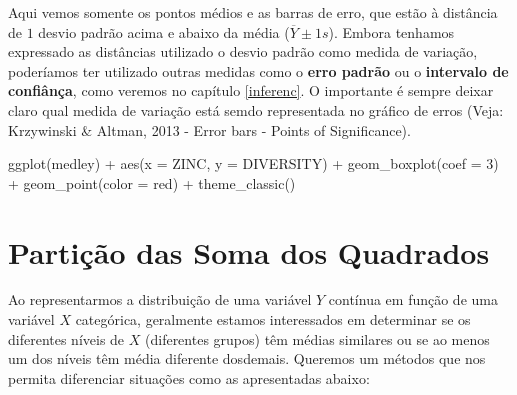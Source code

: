 \documentclass[
]{book}
\newenvironment{Shaded}{\begin{snugshade}}{\end{snugshade}}
\newcommand{\AttributeTok}[1]{\textcolor[rgb]{0.77,0.63,0.00}{#1}}
\newcommand{\DecValTok}[1]{\textcolor[rgb]{0.00,0.00,0.81}{#1}}
\newcommand{\FunctionTok}[1]{\textcolor[rgb]{0.00,0.00,0.00}{#1}}
\newcommand{\NormalTok}[1]{#1}
\newcommand{\SpecialCharTok}[1]{\textcolor[rgb]{0.00,0.00,0.00}{#1}}
\newcommand{\StringTok}[1]{\textcolor[rgb]{0.31,0.60,0.02}{#1}}
\begin{document}
Aqui vemos somente os pontos médios e as barras de erro, que estão à distância de \(1\) desvio padrão acima e abaixo da média (\(\overline{Y} \pm 1s\)). Embora tenhamos expressado as distâncias utilizado o desvio padrão como medida de variação, poderíamos ter utilizado outras medidas como o \textbf{erro padrão} ou o \textbf{intervalo de confiânça}, como veremos no capítulo \ref{inferenc}. O importante é sempre deixar claro qual medida de variação está semdo representada no gráfico de erros (Veja: Krzywinski \& Altman, 2013 - Error bars - Points of Significance).

\begin{Shaded}
\begin{Highlighting}[]
\FunctionTok{ggplot}\NormalTok{(medley) }\SpecialCharTok{+}
  \FunctionTok{aes}\NormalTok{(}\AttributeTok{x =}\NormalTok{ ZINC, }\AttributeTok{y =}\NormalTok{ DIVERSITY) }\SpecialCharTok{+}
  \FunctionTok{geom\_boxplot}\NormalTok{(}\AttributeTok{coef =} \DecValTok{3}\NormalTok{) }\SpecialCharTok{+}
  \FunctionTok{geom\_point}\NormalTok{(}\AttributeTok{color =} \StringTok{\textquotesingle{}red\textquotesingle{}}\NormalTok{) }\SpecialCharTok{+}
  \FunctionTok{theme\_classic}\NormalTok{()}
\end{Highlighting}
\end{Shaded}

\hypertarget{partiuxe7uxe3o-das-soma-dos-quadrados}{%
\section{Partição das Soma dos Quadrados}\label{partiuxe7uxe3o-das-soma-dos-quadrados}}

Ao representarmos a distribuição de uma variável \(Y\) contínua em função de uma variável \(X\) categórica, geralmente estamos interessados em determinar se os diferentes níveis de \(X\) (diferentes grupos) têm médias similares ou se ao menos um dos níveis têm média diferente dosdemais. Queremos um métodos que nos permita diferenciar situações como as apresentadas abaixo:
\end{document}
